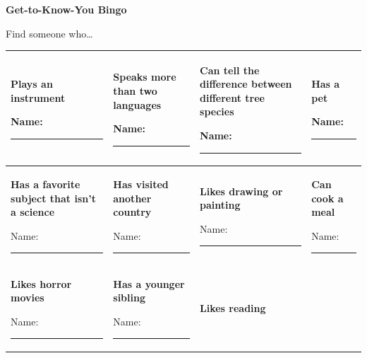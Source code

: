 \documentclass[a4paper,12pt]{article}
\begin{document}
\begin{center}
    {\LARGE\bfseries Get-to-Know-You Bingo}

    \vspace{0.3cm}
    
    {\large Find someone who\dots}
\end{center}

\vspace{0.3cm}

\noindent
\begin{tabularx}{\textwidth}{|>{\centering\arraybackslash}X|
                              >{\centering\arraybackslash}X|
                              >{\centering\arraybackslash}X|
                              >{\centering\arraybackslash}X|}
\hline

\textbf{Plays an instrument}
\vspace{1.5cm}

Name: \rule{2.5cm}{0.4pt}
&
\textbf{Speaks more than two languages}
\vspace{1.5cm}

Name: \rule{2.5cm}{0.4pt}
&
\textbf{Can tell the difference between different tree species}
\vspace{1.5cm}

Name: \rule{2.5cm}{0.4pt}
&
\textbf{Has a pet}
\vspace{1.5cm}

Name: \rule{2.5cm}{0.4pt}
\\ \hline

\textbf{Has a favorite subject that isn't a science}
\vspace{1.5cm}

Name: \rule{2.5cm}{0.4pt}
&
\textbf{Has visited another country}
\vspace{1.5cm}

Name: \rule{2.5cm}{0.4pt}
&
\textbf{Likes drawing or painting}
\vspace{1.5cm}

Name: \rule{2.5cm}{0.4pt}
&
\textbf{Can cook a meal}
\vspace{1.5cm}

Name: \rule{2.5cm}{0.4pt}
\\ \hline

\textbf{Likes horror movies}
\vspace{1.5cm}

Name: \rule{2.5cm}{0.4pt}
&
\textbf{Has a younger sibling}
\vspace{1.5cm}

Name: \rule{2.5cm}{0.4pt}
&
\textbf{Likes reading}
\vspace{1.5cm}


\end{tabularx}
\end{document}
